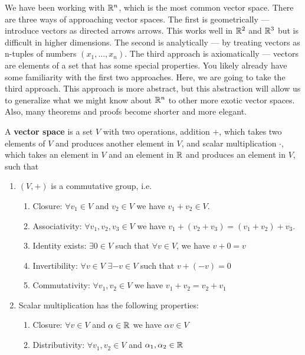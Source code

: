 We have been working with $\mathbb{R}^n$, which is the most common vector
space. There are three ways of approaching vector spaces. The first is
geometrically --- introduce vectors as directed arrows arrows. This
works well in $\mathbb{R}^2$ and $\mathbb{R}^3$ but is difficult in higher dimensions.
The second is analytically --- by treating vectors as n-tuples of
numbers $(x_1, ..., x_n)$. The third approach is axiomatically ---
vectors are elements of a set that has some special properties. You
likely already have some familiarity with the first two
approaches. Here, we are going to take the third approach. This
approach is more abstract, but this abstraction will allow us to
generalize what we might know about $\mathbb{R}^n$ to other more exotic vector
spaces. Also, many theorems and proofs become shorter and more elegant.

\begin{definition}
  A \textbf{vector space} is a set $V$  with
  two operations, addition $+$, which takes two elements of $V$ and
  produces another element in $V$, and scalar multiplication $\cdot$,
  which takes an element in $V$ and an element in $\mathbb{R}$ and
  produces an element in $V$, such that
  \begin{enumerate}
  \item $(V, +)$ is a commutative group, i.e.
    \begin{enumerate}
    \item Closure: $\forall v_1 \in V$ and $v_2 \in V$ we have $v_1
      + v_2 \in V$. 
    \item Associativity: $\forall v_1, v_2, v_3 \in V$ we have $v_1
      + (v_2 + v_3 ) = (v_1 + v_2) + v_3 $. 
    \item Identity exists: $\exists 0 \in V$ such that $\forall v \in
      V$, we have $v + 0 = v$
    \item Invertibility: $\forall v \in V$ $\exists -v \in V$ such
      that $v + (-v) = 0$
    \item Commutativity: $\forall v_1, v_2 \in V$ we have $v_1+v_2 =
      v_2 + v_1$
    \end{enumerate}
  \item Scalar multiplication has the following properties:
    \begin{enumerate}
    \item Closure: $\forall v \in V$ and $\alpha \in \mathbb{R}$ we have
      $\alpha v \in V$
    \item Distributivity: $\forall v_1 , v_2 \in V$ and $\alpha_1, \alpha_2 \in
      \mathbb{R}$
      \begin{align*}

\end{align*}
\end{enumerate}
\end{enumerate}
\end{definition}
